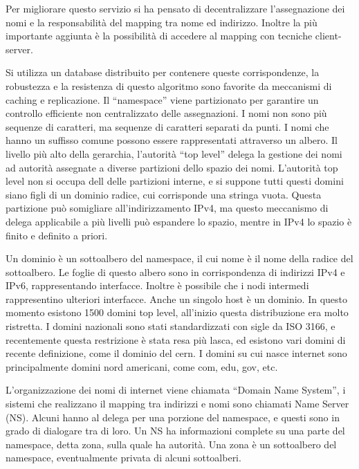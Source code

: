 \documentclass{article}
\numberwithin{equation}{subsection}
\begin{document}
Per migliorare questo servizio si ha pensato di decentralizzare l'assegnazione dei nomi e la responsabilità del mapping tra nome ed indirizzo. Inoltre la più 
importante aggiunta è la possibilità di accedere al mapping con tecniche client-server. 

Si utilizza un database distribuito per contenere queste corrispondenze, la robustezza e la resistenza di questo algoritmo sono favorite da meccanismi di caching e replicazione. 
Il ``namespace'' viene partizionato per garantire un controllo efficiente non centralizzato delle assegnazioni. I nomi non sono più sequenze di caratteri, ma sequenze di 
caratteri separati da punti. 
I nomi che hanno un suffisso comune possono essere rappresentati attraverso un albero. 
Il livello più alto della gerarchia, l'autorità ``top level'' delega la gestione dei nomi ad autorità assegnate a diverse partizioni dello spazio dei nomi. 
L'autorità top level non si occupa dell delle partizioni interne, e si suppone tutti questi domini siano figli di un dominio radice, cui corrisponde una stringa vuota. 
Questa partizione può somigliare all'indirizzamento IPv4, ma questo meccanismo di delega applicabile a più livelli può espandere lo spazio, mentre in IPv4 lo 
spazio è finito e definito a priori. 


Un dominio è un sottoalbero del namespace, il cui nome è il nome della radice del sottoalbero. Le foglie di questo albero sono in corrispondenza di indirizzi IPv4 
e IPv6, rappresentando interfacce. Inoltre è possibile che i nodi intermedi rappresentino ulteriori interfacce. Anche un singolo host è un dominio. 
In questo momento esistono 1500 domini top level, all'inizio questa distribuzione era molto ristretta. I domini nazionali sono stati standardizzati con sigle da ISO 3166, 
e recentemente questa restrizione è stata resa più lasca, ed esistono vari domini di recente definizione, come il dominio del cern. I domini su cui nasce internet sono principalmente 
domini nord americani, come com, edu, gov, etc. 

L'organizzazione dei nomi di internet viene chiamata ``Domain Name System'', i sistemi che realizzano il mapping tra indirizzi e nomi sono chiamati 
Name Server (NS). Alcuni hanno al delega per una porzione del namespace, e questi sono in grado di dialogare tra di loro. Un NS ha informazioni complete su una parte 
del namespace, detta zona, sulla quale ha autorità. Una zona è un sottoalbero del namespace, eventualmente privata di alcuni sottoalberi. 
\end{document}
